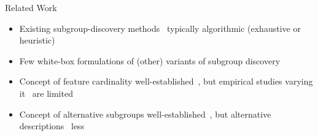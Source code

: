 \documentclass[en, navbaroff, handout]{sdqbeamer}
\begin{document}
\begin{frame}[t]{Related Work}
	\begin{itemize}
		\item Existing subgroup-discovery methods~\cite{atzmueller2015subgroup, helal2016subgroup, herrera2011overview, ventura2018subgroup} typically algorithmic (exhaustive or heuristic)
		\item Few white-box formulations of (other) variants of subgroup discovery~\cite{bonates2008maximum, eckstein2002maximum, guns2011itemset, koccak2020exploiting, louveaux2014combinatorial}
		\item Concept of feature cardinality well-established~\cite{herrera2011overview, meeng2021real}, but empirical studies varying it~\cite{friedman1999bump, lemmerich2010fast, meeng2021real, proencca2022robust} are limited
		\item Concept of alternative subgroups well-established~\cite{atzmueller2015subgroup, belfodil2019fssd, bosc2018anytime, leeuwen2012diverse, lucas2018ssdp+}, but alternative descriptions~\cite{boley2009non, galbrun2017redescription, leeuwen2012diverse, lopez2023discovering} less
	\end{itemize}
\end{frame}
\end{document}
